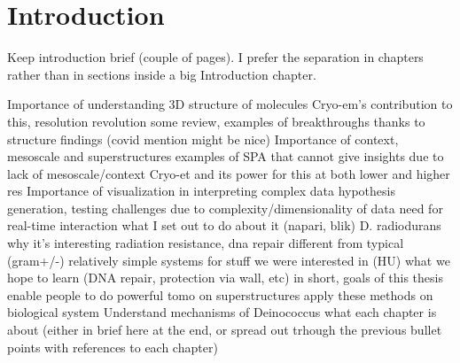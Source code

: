 \chapter{Introduction}

Keep introduction brief (couple of pages). I prefer the separation in chapters rather than in sections inside a big Introduction chapter.

\begin{outline}
\1 Importance of understanding 3D structure of molecules
    \2 Cryo-em's contribution to this, resolution revolution
    \2 some review, examples of breakthroughs thanks to structure findings (covid mention might be nice)
\1 Importance of context, mesoscale and superstructures
    \2 examples of SPA that cannot give insights due to lack of mesoscale/context
    \2 Cryo-et and its power for this at both lower and higher res
\1 Importance of visualization in interpreting complex data
    \2 hypothesis generation, testing
    \2 challenges due to complexity/dimensionality of data
    \2 need for real-time interaction
    \2 what I set out to do about it (napari, blik)
\1 D. radiodurans
    \2 why it's interesting
        \3 radiation resistance, dna repair
        \3 different from typical (gram+/-)
        \3 relatively simple systems for stuff we were interested in (HU)
    \2 what we hope to learn (DNA repair, protection via wall, etc)
\1 in short, goals of this thesis
    \2 enable people to do powerful tomo on superstructures
    \2 apply these methods on biological system
    \2 Understand mechanisms of Deinococcus
\1 what each chapter is about (either in brief here at the end, or spread out trhough the previous bullet points with references to each chapter)
\end{outline}
